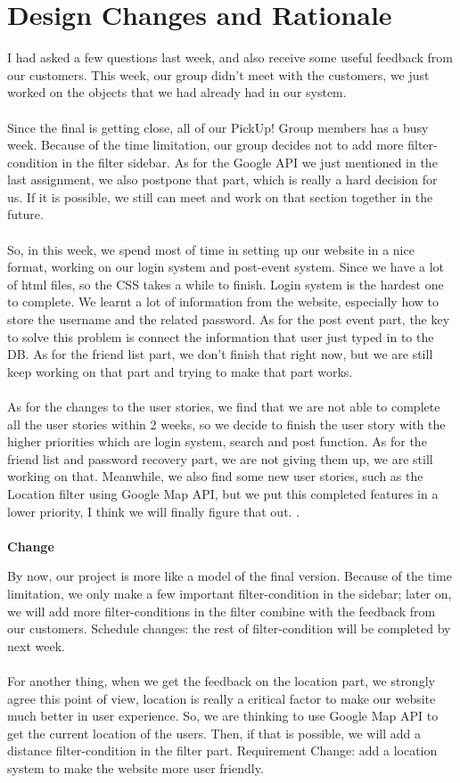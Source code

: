 \documentclass[a4paper]{article}
\begin{document}
\section{Design Changes and Rationale}
I had asked a few questions last week, and also receive some useful feedback from our customers. This week, our group didn’t meet with the customers, we just worked on the objects that we had already had in our system. \\
\\
Since the final is getting close, all of our PickUp! Group members has a busy week. Because of the time limitation, our group decides not to add more filter-condition in the filter sidebar. As for the Google API we just mentioned in the last assignment, we also postpone that part, which is really a hard decision for us. If it is possible, we still can meet and work on that section together in the future. \\
\\
So, in this week, we spend most of time in setting up our website in a nice format, working on our login system and post-event system. Since we have a lot of html files, so the CSS takes a while to finish. Login system is the hardest one to complete. We learnt a lot of information from the website, especially how to store the username and the related password. As for the post event part, the key to solve this problem is connect the information that user just typed in to the DB. As for the friend list part, we don’t finish that right now, but we are still keep working on that part and trying to make that part works. \\
\\
As for the changes to the user stories, we find that we are not able to complete all the user stories within 2 weeks, so we decide to finish the user story with the higher priorities which are login system, search and post function. As for the friend list and password recovery part, we are not giving them up, we are still working on that. Meanwhile, we also find some new user stories, such as the Location filter using Google Map API, but we put this completed features in a lower priority, I think we will finally figure that out. .  \\
\\
\textbf{Change}

By now, our project is more like a model of the final version. Because of the time limitation, we only make a few important filter-condition in the sidebar; later on, we will add more filter-conditions in the filter combine with the feedback from our customers. 
Schedule changes: the rest of filter-condition will be completed by next week. 
\\
\\
For another thing, when we get the feedback on the location part, we strongly agree this point of view, location is really a critical factor to make our website much better in user experience. So, we are thinking to use Google Map API to get the current location of the users. Then, if that is possible, we will add a distance filter-condition in the filter part.
Requirement Change: add a location system to make the website more user friendly.
\end{document}
